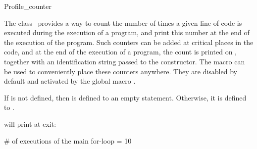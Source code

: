 
\begin{ccRefClass}{Profile_counter}

\ccDefinition


The class \ccRefName\ provides a way to count the number of times a given
line of code is executed during the execution of a program, and print this
number at the end of the execution of the program.  Such counters can be added
at critical places in the code, and at the end of the execution of a program,
the count is printed on , together with an identification
string passed to the constructor.  The macro  can be
used to conveniently place these counters anywhere.  They are disabled by
default and activated by the global macro .


\ccCreation

\ccPropagateThreeToTwoColumns



\ccOperations


{If  is not defined, then  is defined
to an empty statement.  Otherwise, it is defined to .}


will print at exit:

\begin{ccExampleCode}
 # of executions of the main for-loop = 10
\end{ccExampleCode}

\end{ccRefClass}
